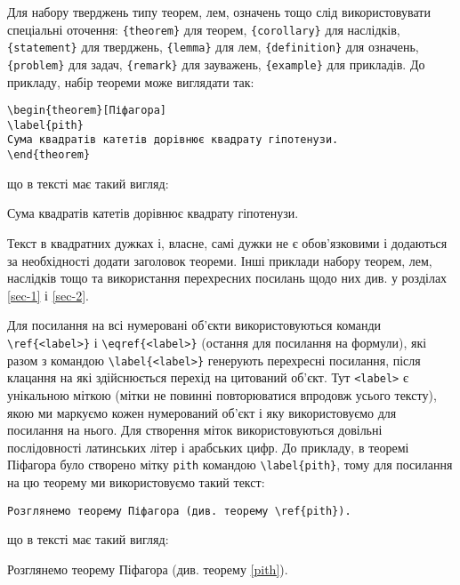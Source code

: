 Для набору тверджень типу теорем, лем, означень тощо слід використовувати спеціальні оточення: {\color{bluegreen}\verb|{theorem}|} для теорем, {\color{bluegreen}\verb|{corollary}|} для наслідків,  {\color{bluegreen}\verb|{statement}|} для тверджень, {\color{bluegreen}\verb|{lemma}|} для лем, {\color{bluegreen}\verb|{definition}|} для означень, {\color{bluegreen}\verb|{problem}|} для задач, {\color{bluegreen}\verb|{remark}|} для зауважень, {\color{bluegreen}\verb|{example}|} для прикладів. До прикладу, набір теореми може виглядати так:
{\color{bluegreen}%
\begin{verbatim}
\begin{theorem}[Піфагора]
\label{pith}
Сума квадратів катетів дорівнює квадрату гіпотенузи.
\end{theorem}
\end{verbatim}%
}\noindent%
що в тексті має такий вигляд:
\begin{theorem}[Піфагора]
\label{pith}
Сума квадратів катетів дорівнює квадрату гіпотенузи.
\end{theorem} 
Текст в квадратних дужках і, власне, самі дужки не є обов'язковими і додаються за необхідності додати заголовок теореми. Інші приклади набору теорем, лем, наслідків тощо та використання перехресних посилань щодо них див. у розділах \ref{sec-1} і \ref{sec-2}.

Для посилання на всі нумеровані об'єкти використовуються команди {\color{bluegreen}\verb|\ref{<label>}|} і {\color{bluegreen}\verb|\eqref{<label>}|} (остання для посилання на формули), які разом з командою {\color{bluegreen}\verb|\label{<label>}|} генерують перехресні посилання, після клацання на які здійснюється перехід на цитований об'єкт. Тут  {\color{bluegreen}\verb|<label>|} є унікальною міткою (мітки не повинні повторюватися впродовж усього тексту), якою ми маркуємо кожен нумерований об'єкт і яку використовуємо для посилання на нього. Для створення міток використовуються довільні послідовності латинських літер і арабських цифр.
До прикладу, в теоремі Піфагора було створено мітку {\color{bluegreen}\verb|pith|} командою {\color{bluegreen}\verb|\label{pith}|}, тому для посилання на цю теорему ми використовуємо такий текст:

{\color{bluegreen}%
\begin{verbatim}
Розглянемо теорему Піфагора (див. теорему \ref{pith}).
\end{verbatim}%
}\noindent%
що в тексті має такий вигляд:

\noindent%
Розглянемо теорему Піфагора (див. теорему \ref{pith}). 


